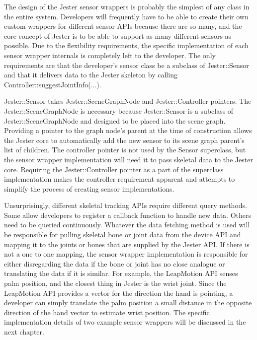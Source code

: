 The design of the Jester sensor wrappers is probably the simplest of any class in the entire system. Developers will frequently have to be able to create their own custom wrappers for different sensor APIs because there are so many, and the core concept of Jester is to be able to support as many different sensors as possible. Due to the flexibility requirements, the specific implementation of each sensor wrapper internals is completely left to the developer. The only requirements are that the developer's sensor class be a subclass of Jester::Sensor and that it delivers data to the Jester skeleton by calling Controller::suggestJointInfo(...). 

Jester::Sensor takes Jester::SceneGraphNode and Jester::Controller pointers. The Jester::SceneGraphNode is necessary because Jester::Sensor is a subclass of Jester::SceneGraphNode and designed to be placed into the scene graph. Providing a pointer to the graph node's parent at the time of construction allows the Jester core to automatically add the new sensor to its scene graph parent's list of children. The controller pointer is not used by the Sensor superclass, but the sensor wrapper implementation will need it to pass skeletal data to the Jester core. Requiring the Jester::Controller pointer as a part of the superclass implementation makes the controller requirement apparent and attempts to simplify the process of creating sensor implementations. 

Unsurprisingly, different skeletal tracking APIs require different query methods. Some allow developers to register a callback function to handle new data. Others need to be queried continuously. Whatever the data fetching method is used will be responsible for pulling skeletal bone or joint data from the device API and mapping it to the joints or bones that are supplied by the Jester API. If there is not a one to one mapping, the sensor wrapper implementation is responsible for either disregarding the data if the bone or joint has no close analogue or translating the data if it is similar. For example, the LeapMotion API senses palm position, and the closest thing in Jester is the wrist joint. Since the LeapMotion API provides a vector for the direction the hand is pointing, a developer can simply translate the palm position a small distance in the opposite direction of the hand vector to estimate wrist position. The specific implementation details of two example sensor wrappers will be discussed in the next chapter.

